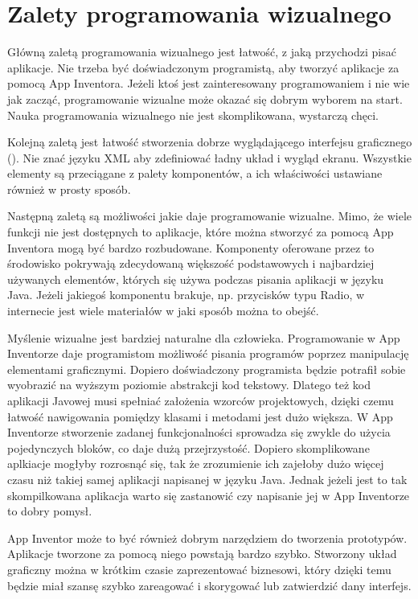 \section{Zalety programowania wizualnego}

Główną zaletą programowania wizualnego jest łatwość, z jaką przychodzi pisać aplikacje. Nie trzeba być doświadczonym programistą, aby tworzyć aplikacje za pomocą App Inventora. Jeżeli ktoś jest zainteresowany programowaniem i nie wie jak zacząć, programowanie wizualne może okazać się dobrym wyborem na start. Nauka programowania wizualnego nie jest skomplikowana, wystarczą chęci. 

Kolejną zaletą jest łatwość stworzenia dobrze wyglądającego interfejsu graficznego (). Nie znać języku XML aby zdefiniować ładny układ i wygląd ekranu. Wszystkie elementy są przeciągane z palety komponentów, a ich właściwości ustawiane również w prosty sposób.

Następną zaletą są możliwości jakie daje programowanie wizualne. Mimo, że wiele funkcji nie jest dostępnych to aplikacje, które można stworzyć za pomocą App Inventora mogą być bardzo rozbudowane. Komponenty oferowane przez to środowisko pokrywają zdecydowaną większość podstawowych i najbardziej używanych elementów, których się używa podczas pisania aplikacji w języku Java. Jeżeli jakiegoś komponentu brakuje, np. przycisków typu Radio, w internecie jest wiele materiałów w jaki sposób można to obejść.

Myślenie wizualne jest bardziej naturalne dla człowieka. Programowanie w App Inventorze daje programistom możliwość pisania programów poprzez manipulację elementami graficznymi. Dopiero doświadczony programista będzie potrafił sobie wyobrazić na wyższym poziomie abstrakcji kod tekstowy. Dlatego też kod aplikacji Javowej musi spełniać założenia wzorców projektowych, dzięki czemu łatwość nawigowania pomiędzy klasami i metodami jest dużo większa. W App Inventorze stworzenie zadanej funkcjonalności sprowadza się zwykle do użycia pojedynczych bloków, co daje dużą przejrzystość. Dopiero skomplikowane aplkiacje mogłyby rozrosnąć się, tak że zrozumienie ich zajełoby dużo więcej czasu niż takiej samej aplikacji napisanej w języku Java. Jednak jeżeli jest to tak skompilkowana aplikacja warto się zastanowić czy napisanie jej w App Inventorze to dobry pomysł.

App Inventor może to być również dobrym narzędziem do tworzenia prototypów. Aplikacje tworzone za pomocą niego powstają bardzo szybko. Stworzony układ graficzny można w krótkim czasie zaprezentować biznesowi, który dzięki temu będzie miał szansę szybko zareagować i skorygować lub zatwierdzić dany interfejs.

